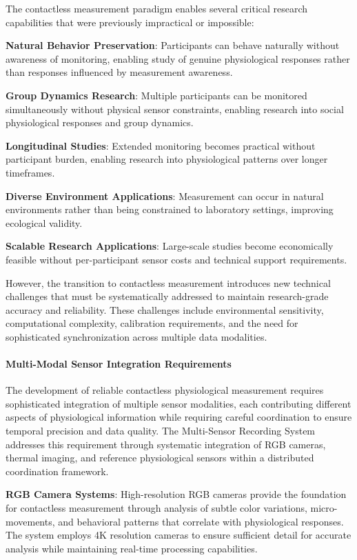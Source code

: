 \documentclass[12pt,a4paper]{report}
\begin{document}
The contactless measurement paradigm enables several critical research capabilities that were previously impractical or
impossible:

\textbf{Natural Behavior Preservation}: Participants can behave naturally without awareness of monitoring, enabling study of
genuine physiological responses rather than responses influenced by measurement awareness.

\textbf{Group Dynamics Research}: Multiple participants can be monitored simultaneously without physical sensor constraints,
enabling research into social physiological responses and group dynamics.

\textbf{Longitudinal Studies}: Extended monitoring becomes practical without participant burden, enabling research into
physiological patterns over longer timeframes.

\textbf{Diverse Environment Applications}: Measurement can occur in natural environments rather than being constrained to
laboratory settings, improving ecological validity.

\textbf{Scalable Research Applications}: Large-scale studies become economically feasible without per-participant sensor
costs and technical support requirements.

However, the transition to contactless measurement introduces new technical challenges that must be systematically
addressed to maintain research-grade accuracy and reliability. These challenges include environmental sensitivity,
computational complexity, calibration requirements, and the need for sophisticated synchronization across multiple data
modalities.

\paragraph{Multi-Modal Sensor Integration Requirements}

The development of reliable contactless physiological measurement requires sophisticated integration of multiple sensor
modalities, each contributing different aspects of physiological information while requiring careful coordination to
ensure temporal precision and data quality. The Multi-Sensor Recording System addresses this requirement through
systematic integration of RGB cameras, thermal imaging, and reference physiological sensors within a distributed
coordination framework.

\textbf{RGB Camera Systems}: High-resolution RGB cameras provide the foundation for contactless measurement through analysis
of subtle color variations, micro-movements, and behavioral patterns that correlate with physiological responses. The
system employs 4K resolution cameras to ensure sufficient detail for accurate analysis while maintaining real-time
processing capabilities.
\end{document}
